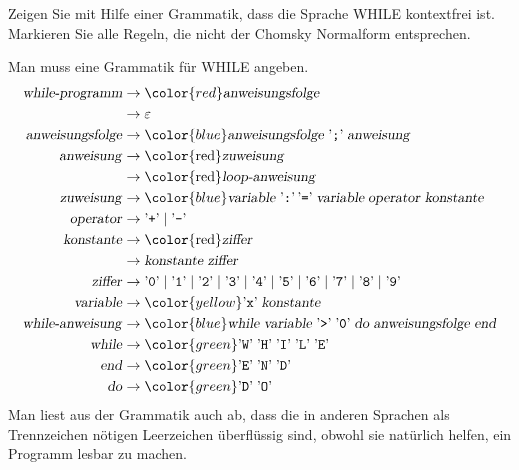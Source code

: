 Zeigen Sie mit Hilfe einer Grammatik, dass die Sprache WHILE kontextfrei ist.
Markieren Sie alle Regeln, die nicht der Chomsky Normalform entsprechen.

\begin{loesung}
Man muss eine Grammatik für WHILE angeben.
\begin{align*}
\text{\textsl{while-programm}}&\to{\color{red}\text{\textsl{anweisungsfolge}}}\\
&\to\varepsilon\\
\text{\textsl{anweisungsfolge}}
&\to{\color{blue}\text{\textsl{anweisungsfolge}}\;\text{'{\tt ;}'}\;
\text{\textsl{anweisung}}}
\\
\text{\textsl{anweisung}}
&\to\text{\color{red}\textsl{zuweisung}}
\\
&\to\text{\color{red}\textsl{loop-anweisung}}
\\
\text{\textsl{zuweisung}}
&\to
{\color{blue}
\text{\textsl{variable}}\; \text{'{\tt :}'}\, \text{'{\tt =}'}\;
\textsl{variable}\;\text{\textsl{operator}}\;\text{\textsl{konstante}}}
\\
\text{\textsl{operator}}
&\to\text{'{\tt +}'}\;|\;\text{'{\tt -}'}
\\
\text{\textsl{konstante}}&\to\text{\color{red}\textsl{ziffer}}\\
&\to\text{\textsl{konstante}}\;\text{\textsl{ziffer}}
\\
\text{\textsl{ziffer}}&\to 
\text{'{\tt 0}'}\;|\;
\text{'{\tt 1}'}\;|\;
\text{'{\tt 2}'}\;|\;
\text{'{\tt 3}'}\;|\;
\text{'{\tt 4}'}\;|\;
\text{'{\tt 5}'}\;|\;
\text{'{\tt 6}'}\;|\;
\text{'{\tt 7}'}\;|\;
\text{'{\tt 8}'}\;|\;
\text{'{\tt 9}'}\\
\text{\textsl{variable}}&\to{\color{yellow} \text{'{\tt x}'}\;\text{\textsl{konstante}}}\\
\text{\textsl{while-anweisung}}&\to{\color{blue}
\text{\textsl{while}}\;
\text{\textsl{variable}}\;
\text{'{\tt >}'}\;
\text{'{\tt 0}'}\;
\text{\textsl{do}}\;
\text{\textsl{anweisungsfolge}}\;
\text{\textsl{end}}}\\
\text{\textsl{while}}&\to
{\color{green}\text{'{\tt W}'}\; \text{'{\tt H}'}\; \text{'{\tt I}'}\; \text{'{\tt L}'}\; \text{'{\tt E}'}}\\
\text{\textsl{end}}&\to{\color{green} \text{'{\tt E}'}\; \text{'{\tt N}'}\; \text{'{\tt D}'}}\\
\text{\textsl{do}}&\to{\color{green} \text{'{\tt D}'}\; \text{'{\tt O}'}} \\
\end{align*}
Man liest aus der Grammatik auch ab, dass die in anderen Sprachen als
Trennzeichen nötigen Leerzeichen überflüssig sind, obwohl sie natürlich
helfen, ein Programm lesbar zu machen.


\end{loesung}
